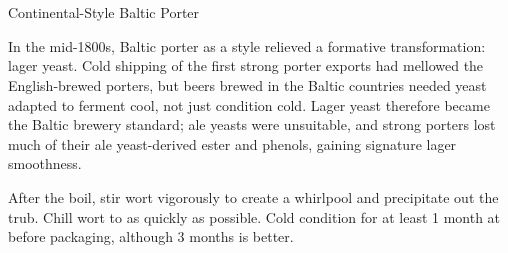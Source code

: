 \part{\stylebalticporter}

\begin{recipie}{Continental-Style Baltic Porter}

\begin{aboutblock}
In the mid-1800s, Baltic porter as a style relieved a formative transformation:
lager yeast. Cold shipping of the first strong porter exports had mellowed the
English-brewed porters, but beers brewed in the Baltic countries needed yeast
adapted to ferment cool, not just condition cold. Lager yeast therefore became
the Baltic brewery standard; ale yeasts were unsuitable, and strong porters
lost much of their ale yeast-derived ester and phenols, gaining signature
lager smoothness.
\end{aboutblock}


\begin{methodandtiming}
 
\begin{mashsteps}
\end{mashsteps}

\begin{fermentationsteps}
\end{fermentationsteps}

\begin{directions}
After the boil, stir wort vigorously to create a
whirlpool and precipitate out the trub. Chill wort to  as quickly
as possible. Cold condition for at least 1 month at  before
packaging, although 3 months is better.
\end{directions}

\end{methodandtiming}

\begin{ingredientsblock}

\begin{malts}
\end{malts}


\end{ingredientsblock}
\end{recipie}
